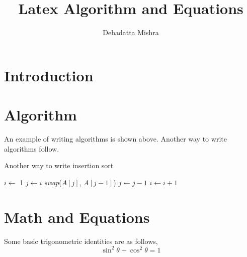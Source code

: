 \documentclass[a4paper, 10pt,twocolumn]{article}
\title{Latex Algorithm and Equations}
\author{Debadatta Mishra}
\date{}
\begin{document}
\maketitle
\begin{abstract}
\lipsum[15]
\end{abstract}    
\section{Introduction}
\lipsum
\section{Algorithm}

%   
%    
%

An example of writing algorithms is shown above.
Another way to write algorithms follow.

\begin{algorithm}
  \caption{Another way to write insertion sort}
  \label{algo:ins_sort1}
  \begin{algorithmic}[1]
     \newline
      \State $i \leftarrow$ 1
          \State $j \leftarrow i$ \newline
            \State \textit{swap}($A[j]$, $A[j-1]$)
            \State $j \leftarrow j -1$ 
         \EndWhile
      \State $i \leftarrow i + 1$
      \EndWhile
     \EndProcedure 
  \end{algorithmic}
\end{algorithm}

\section{Math and Equations}
Some basic trigonometric identities are as follows,
\begin{equation}
\sin^2\theta + \cos^2\theta = 1
\end{equation}
\end{document}
